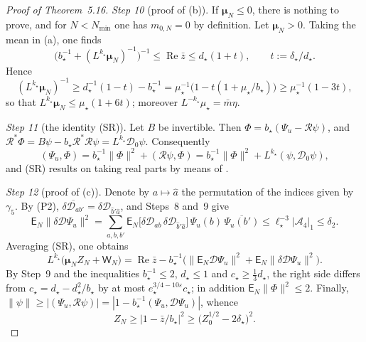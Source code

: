 \documentclass[11pt,letterpaper,reqno]{amsart}
\theoremstyle{definition}
\begin{document}
\begin{proof}[Proof of Theorem~5.16]
\emph{Step 10} (proof of (b)).
If $\boldsymbol\mu_N\le0$, there is nothing to prove, and for $N<N_{\min}$ one has $m_{0,N}=0$ by definition.
Let $\boldsymbol\mu_N>0$.
Taking the mean in (a), one finds
\begin{equation*}
\bigl(b_\star^{-1}+(L^{k_\star}\boldsymbol\mu_N)^{-1}\bigr)^{-1}\le\operatorname{Re}\bar z\le d_\star(1+t),\qquad t:=\delta_\star/d_\star .
\end{equation*}
Hence
\begin{equation*}
(L^{k_\star}\boldsymbol\mu_N)^{-1}\ge d_\star^{-1}(1-t)-b_\star^{-1}=\mu_\star^{-1}\bigl(1-t(1+\mu_\star/b_\star)\bigr)\ge\mu_\star^{-1}(1-3t),
\end{equation*}
so that $L^{k_\star}\boldsymbol\mu_N\le\mu_\star(1+6t)$;
moreover $L^{-k_\star}\mu_\star=\bar m\eta$.

\emph{Step 11} (the identity (SR)).
Let $B$ be invertible.
Then $\Phi=b_\star(\Psi_u-\mathcal R\psi)$, and $\mathcal R^*\Phi=\allowbreak B\psi-b_\star\mathcal R^*\mathcal R\psi=\allowbreak L^{k_\star}\mathcal D_0\psi$.
Consequently
\begin{equation*}
(\Psi_u,\Phi)=b_\star^{-1}\|\Phi\|^2+(\mathcal R\psi,\Phi)=b_\star^{-1}\|\Phi\|^2+L^{k_\star}(\psi,\mathcal D_0\psi),
\end{equation*}
and (SR) results on taking real parts by means of \cite[(I.O2)]{QEDIII}.

\emph{Step 12} (proof of (c)).
Denote by $a\mapsto\hat a$ the permutation of the indices given by $\gamma_5$.
By (P2), $\overline{\delta\mathcal D_{ab'}}=\allowbreak \delta\mathcal D_{\hat b'\hat a}$, and Steps~8 and~9 give
\begin{equation*}
\mathsf E_N\|\delta\mathcal D\Psi_u\|^2=\sum_{a,b,b'}\mathsf E_N\bigl[\delta\mathcal D_{ab}\,\delta\mathcal D_{\hat b'\hat a}\bigr]\,\Psi_u(b)\,\overline{\Psi_u(b')}\le\ell_\star^{-3}|\mathcal A_4|_1\le\delta_2 .
\end{equation*}
Averaging (SR), one obtains
\begin{equation*}
L^{k_\star}\bigl(\boldsymbol\mu_NZ_N+\mathsf W_N\bigr)=\operatorname{Re}\bar z-b_\star^{-1}\bigl(\|\mathsf E_N\mathcal D\Psi_u\|^2+\mathsf E_N\|\delta\mathcal D\Psi_u\|^2\bigr).
\end{equation*}
By Step~9 and the inequalities $b_\star^{-1}\le2$, $d_\star\le1$ and $c_\star\ge\frac13d_\star$, the right side differs from $c_\star=d_\star-d_\star^2/b_\star$ by at most $e_\star^{3/4-10\varepsilon}c_\star$;
in addition $\mathsf E_N\|\Phi\|^2\le2$.
Finally, $\|\psi\|\ge|(\Psi_u,\allowbreak \mathcal R\psi)|=\allowbreak |1-b_\star^{-1}(\Psi_u,\allowbreak \mathcal D\Psi_u)|$, whence
\begin{equation*}
Z_N\ge|1-\bar z/b_\star|^2\ge\bigl(Z_0^{1/2}-2\delta_\star\bigr)^2 .
\end{equation*}


\end{proof}
\end{document}
